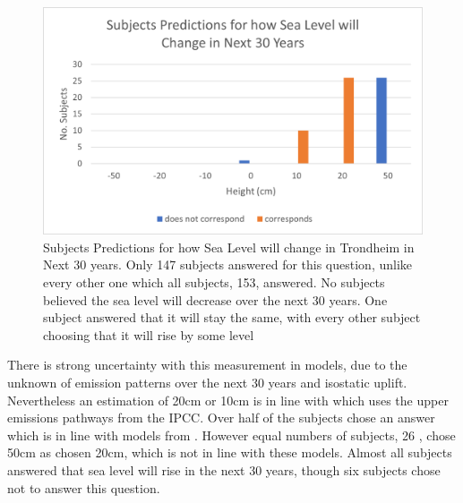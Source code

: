 \paragraph{}

\begin{figure}[H]
    \centering
    \includegraphics{fig_results/slr-future.png}
    \caption{Subjects Predictions for how Sea Level will change in Trondheim in Next 30 years. Only 147 subjects answered for this question, unlike every other one which all subjects, 153, answered. No subjects believed the sea level will decrease over the next 30 years. One subject answered that it will stay the same, with every other subject choosing that it will rise by some level }
    \label{fig:my_label}
\end{figure}

There is strong uncertainty with this measurement in models, due to the unknown of emission patterns over the next 30 years and isostatic uplift. Nevertheless an estimation of 20cm or 10cm is in line with \cite{kartverket_se_2021} which uses the upper emissions pathways from the IPCC. Over half of the subjects chose an answer which is in line with models from \cite{kartverket_se_2021}. However equal numbers of subjects, 26 , chose 50cm as chosen 20cm,  which is not in line with these models. Almost all subjects answered that sea level will rise in the next 30 years, though six subjects chose not to answer this question.  


